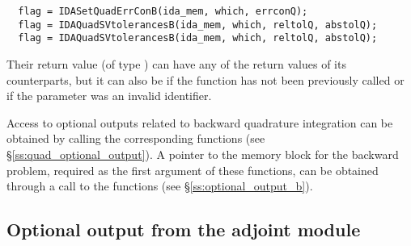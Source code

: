 \begin{verbatim}
  flag = IDASetQuadErrConB(ida_mem, which, errconQ);
  flag = IDAQuadSVtolerancesB(ida_mem, which, reltolQ, abstolQ);
  flag = IDAQuadSVtolerancesB(ida_mem, which, reltolQ, abstolQ);
\end{verbatim}
Their return value  (of type ) can have any of the return values 
of its counterparts, but it can also be  if the function 
 has not been previously called or  if the
parameter  was an invalid identifier.

Access to optional outputs related to backward quadrature integration can be obtained
by calling the corresponding  functions 
(see \S\ref{ss:quad_optional_output}). 
A pointer to the {\idas} memory block for the backward problem, required as the first 
argument of these functions, can be obtained through a call to the functions 
 (see \S\ref{ss:optional_output_b}).



\subsection{Optional output from the adjoint module}
